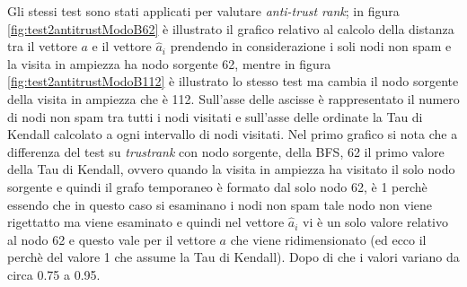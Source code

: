 Gli stessi test sono stati applicati per valutare \textit{anti-trust rank}; in figura \ref{fig:test2antitrustModoB62} è illustrato il grafico relativo al calcolo della distanza tra il vettore \(a\) e il vettore \(\hat{a}_i\) prendendo in considerazione i soli nodi non spam e la visita in ampiezza ha nodo sorgente 62, mentre in figura \ref{fig:test2antitrustModoB112} è illustrato lo stesso test ma cambia il nodo sorgente della visita in ampiezza che è 112. Sull'asse delle ascisse è rappresentato il numero di nodi non spam tra tutti i nodi visitati e sull'asse delle ordinate la Tau di Kendall calcolato a ogni intervallo di nodi visitati. Nel primo grafico si nota che a differenza del test su \textit{trustrank} con nodo sorgente, della BFS, 62 il primo valore della Tau di Kendall, ovvero quando la visita in ampiezza ha visitato il solo nodo sorgente e quindi il grafo temporaneo è formato dal solo nodo 62, è 1 perchè essendo che in questo caso si esaminano i nodi non spam tale nodo non viene rigettatto ma viene 
esaminato e quindi nel vettore \(\hat{a}_i\) vi è un solo valore relativo al nodo 62 e questo vale per il vettore \(a\) che viene ridimensionato (ed ecco il perchè del valore 1 che assume la Tau di Kendall). Dopo di che i valori variano da circa 0.75 a 0.95.
